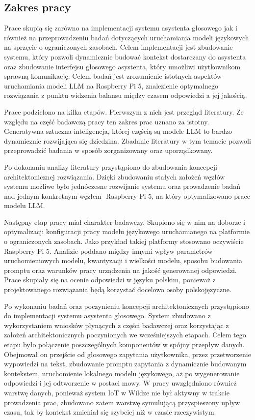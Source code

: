 \subsection{Zakres pracy}

Prace skupią się zarówno na implementacji systemu asystenta głosowego jak i również na przeprowadzeniu badań dotyczących uruchamiania modeli językowych na sprzęcie o ograniczonych zasobach. Celem implementacji jest zbudowanie systemu, który pozwoli dynamicznie budować kontekst dostarczany do asystenta oraz zbudowanie interfejsu głosowego asystenta, który umożliwi użytkownikom sprawną komunikację. Celem badań jest zrozumienie istotnych aspektów uruchamiania modeli LLM na Raspberry Pi 5, znalezienie optymalnego rozwiązania z punktu widzenia balansu między czasem odpowiedzi a jej jakością.

Prace podzielono na kilka etapów. Pierwszym z nich jest przegląd literatury. Ze względu na część badawczą pracy ten zakres prac uznano za istotny. Generatywna sztuczna inteligencja, której częścią są modele LLM to bardzo dynamicznie rozwijająca się dziedzina. Zbadanie literatury w tym temacie pozwoli przeprowadzić badania w sposób zorganizowany oraz uporządkowany. 

Po dokonaniu analizy literatury przystąpiono do zbudowania koncepcji architektonicznej rozwiązania. Dzięki zbudowaniu stałych założeń węzłów systemu możliwe było jednóczesne rozwijanie systemu oraz prowadzenie badań nad jednym konkretnym węzłem- Raspberry Pi 5, na który optymalizowano prace modelu LLM. 

Następny etap pracy miał charakter badawczy. Skupiono się w nim na doborze i optymalizacji konfiguracji pracy modelu językowego uruchamianego na platformie o ograniczonych zasobach. Jako przykład takiej platformy stosowano oczywiście Raspberry Pi 5. Analizie poddano między innymi wpływ parametrów uruchomieniowych modelu, kwantyzacji i wielkości modelu, sposobu budowania promptu oraz warunków pracy urządzenia na jakość generowanej odpowiedzi. Prace skupiały się na ocenie  odpowiedzi w języku polskim, ponieważ z projektowanego rozwiązania będą korzystać docelowo osoby polskojęzyczne.


Po wykonaniu badań oraz poczynieniu koncepcji architektonicznych przystąpiono do implementacji systemu asystenta głosowego. System zbudowano z wykorzystaniem wniosków płynących z części badawczej oraz korzystając z założeń architektonicznych poczynionych we wcześniejszych etapach.  
Celem tego etapu było połączenie poszczególnych komponentów w spójny przepływ danych. Obejmował on przejście od głosowego zapytania użytkownika, przez przetworzenie wypowiedzi na tekst, zbudowanie promptu zapytania z dynamicznie budowanym kontekstem, uruchomienie lokalnego modelu językowego, aż po wygenerowanie odpowiedzi i jej odtworzenie w postaci mowy. W pracy uwzględniono również warstwę danych, ponieważ system IoT w Wildze nie był aktywny w trakcie prowadzenia prac, zbudowano zatem warstwę symulującą przyspieszony upływ czasu, tak by kontekst zmieniał się szybciej niż w czasie rzeczywistym.

